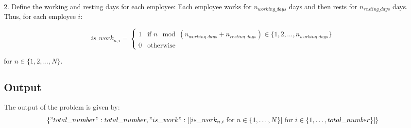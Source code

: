 \documentclass{article}
\begin{document}
2. Define the working and resting days for each employee:
   Each employee works for \( n_{working\_days} \) days and then rests for \( n_{resting\_days} \) days. Thus, for each employee \( i \):

\[
is\_work_{n,i} = 
\begin{cases}
1 & \text{if } n \mod (n_{working\_days} + n_{resting\_days}) \in \{1, 2, \ldots, n_{working\_days}\} \\
0 & \text{otherwise}
\end{cases}
\]

for \( n \in \{1, 2, \ldots, N\} \).

\subsection*{Output}
The output of the problem is given by:
\[
\{ 
    "total\_number": total\_number, 
    "is\_work": [[is\_work_{n,i} \text{ for } n \in \{1,\ldots,N\}] \text{ for } i \in \{1,\ldots,total\_number\}]
\}
\]
\end{document}

